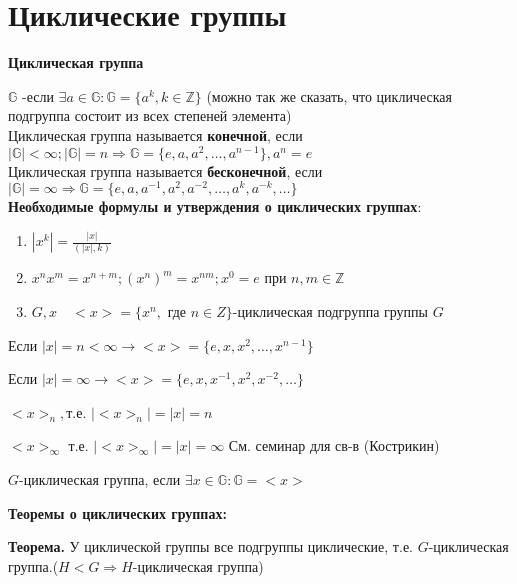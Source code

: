 \documentclass[12pt]{article}
\begin{document}
		\newtheorem{Th}{Теорема}
		\newtheorem{Def}{Определение}
		

		
		
		
		
		
		
		
		\newpage
		\section{Циклические группы}
				\hypertarget{indef:circle_group}{\textbf{Циклическая группа}} $\mathds{G}$ -если $ \exists a \in \mathds{G} : \mathds{G}=\{a^k, k \in \mathds{Z} \}$ (можно так же сказать, что циклическая подгруппа состоит из всех степеней элемента) \\
				Циклическая группа называется \hypertarget{indef:inf_circle_group}{\textbf{конечной}}, если $|\mathds{G}|<\infty; |\mathds{G}|=n \Rightarrow \mathds{G}=\{e,a,a^2, \dots , a^{n-1} \}, a^n=e$\\
				Циклическая группа называется \hypertarget{indef:noninf_circle_gtoup}{\textbf{бесконечной}}, если $|\mathds{G}|= \infty \Rightarrow \mathds{G}=\{ e,a,a^{-1},a^2,a^{-2}, \dots, a^k, a^{-k}, \dots \}$\\
				\hypertarget{f:circle}{\textbf{Необходимые формулы и утверждения о циклических группах}}:
				\begin{enumerate}
					\item $|x^k|=\frac{|x|}{(|x|,k)}$
					\item $x^n x^m=x^{n+m}; (x^n)^m=x^{nm}; x^0=e$ при $n,m \in \mathds{Z}$
					\item$G,x \quad <x>=\{x^n,\text{ где } n\in Z\}$-циклическая подгруппа группы $G$
					
				\end{enumerate} 
					
					Если $|x|=n<\infty \rightarrow <x>= \{e,x,x^2, \dots, x^{n-1} \}$
					
					Если $|x|=\infty \rightarrow <x>=\{e,x,x^{-1},x^2, x^{-2}, \dots \}$ 
					
					$<x>_n, $т.е. $|<x>_n|=|x|=n$
					
					$<x>_\infty$ т.е. $|<x>_\infty|=|x|=\infty$ См. семинар для св-в (Кострикин)
					
					$G$-циклическая группа, если $\exists x\in \mathds{G}:\mathds{G}=<x>$
					
					\hypertarget{th}{\textbf{Теоремы о циклических группах:}}
					
					\textbf{Теорема.} У циклической группы все подгруппы циклические, т.е. $G$-циклическая группа.($H<G \Rightarrow H$-циклическая группа)
					
\end{document}
